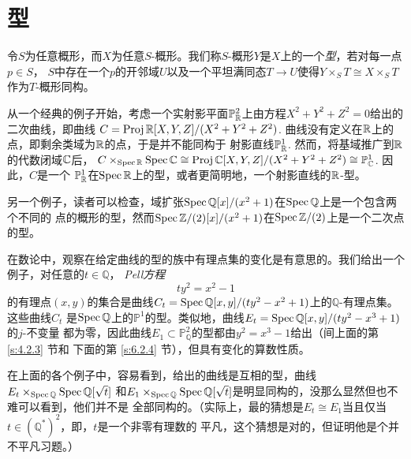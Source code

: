 \section{型}\label{s:4.4}


令$S$为任意概形，而$X$为任意$S$-概形。我们称$S$-概形$Y$是$X$上的一个\textit{型}，若对每一点$p\in S$，
$S$中存在一个$p$的开邻域$U$以及一个平坦满同态$T\to U$使得$Y\times_S T\cong X\times_S T$作为$T$-概形同构。

从一个经典的例子开始，考虑一个实射影平面$\mathbb{P}_{\mathbb{R}}^2$上由方程$X^2+Y^2+Z^2=0$给出的二次曲线，即曲线
$C=\operatorname{Proj} \mathbb{R}[X,Y,Z]/(X^2+Y^2+Z^2)$. 曲线没有定义在$\mathbb{R}$上的点，即剩余类域为$\mathbb{R}$的点，于是并不能同构于
射影直线$\mathbb{P}_{\mathbb{R}}^1$. 然而，将基域推广到$\mathbb{R}$的代数闭域$\mathbb{C}$后，
$C\times_{\operatorname{Spec} \mathbb{R}}\operatorname{Spec} \mathbb{C}\cong \operatorname{Proj} \mathbb{C}[X,Y,Z]/(X^2+Y^2+Z^2)\cong \mathbb{P}_{\mathbb{C}}^1$. 因此，$C$是一个
$\mathbb{P}_{\mathbb{R}}^1$在$\operatorname{Spec} \mathbb{R}$上的型，或者更简明地，一个射影直线的$\mathbb{R}$-型。

另一个例子，读者可以检查，域扩张$\operatorname{Spec} \mathbb Q[x]/(x^2+1)$在$\operatorname{Spec} \mathbb Q$上是一个包含两个不同的
点的概形的型，然而$\operatorname{Spec} \mathbb{Z}/(2)[x]/(x^2+1)$在$\operatorname{Spec} \mathbb{Z}/(2)$上是一个二次点的型。

在数论中，观察在给定曲线的型的族中有理点集的变化是有意思的。我们给出一个例子，对任意的$t\in \mathbb Q$，
\textit{Pell方程}
\[
    ty^2=x^2-1
\]
的有理点$(x,y)$的集合是曲线$C_t=\operatorname{Spec} \mathbb Q[x,y]/(ty^2-x^2+1)$上的$\mathbb Q$-有理点集。这些曲线$C_t$
是$\operatorname{Spec} \mathbb Q$上的$\mathbb P^1$的型。类似地，曲线$E_t=\operatorname{Spec} \mathbb Q[x,y]/(ty^2-x^3+1)$的$j$-不变量
都为零，因此曲线$E_1\subset \mathbb P_{\mathbb Q}^2$的型都由$y^2=x^3-1$给出（间上面的第 \ref{s:4.2.3} 节和
下面的第 \ref{s:6.2.4} 节），但具有变化的算数性质。

在上面的各个例子中，容易看到，给出的曲线是互相的型，曲线$E_t\times_{\operatorname{Spec} \mathbb Q}\operatorname{Spec} \mathbb Q[\sqrt{t}]$
和$E_1\times_{\operatorname{Spec} \mathbb Q}\operatorname{Spec} \mathbb Q[\sqrt{t}]$是明显同构的，没那么显然但也不难可以看到，他们并不是
全部同构的。（实际上，最\naive 的猜想是$E_t\cong E_1$当且仅当$t\in (\mathbb Q^*)^2$，即，$t$是一个非零有理数的
平凡，这个猜想是对的，但证明他是个并不平凡习题。）



\nottran